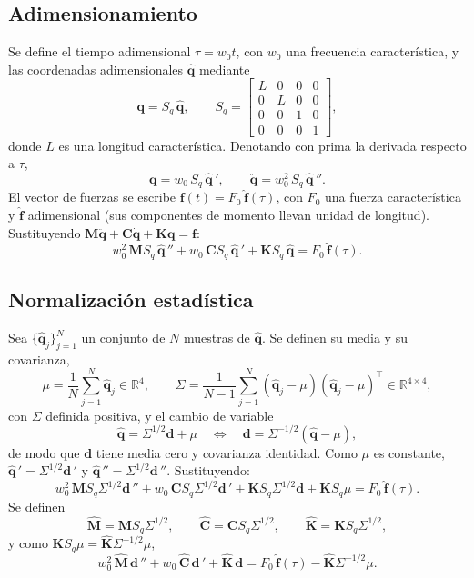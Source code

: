 \subsection{Adimensionamiento}

Se define el tiempo adimensional $\tau=w_0t$, con $w_0$ una frecuencia característica, y las coordenadas 
adimensionales $\hat{\mathbf q}$ mediante
\[
\mathbf q=S_q\,\hat{\mathbf q},\qquad
S_q=\begin{bmatrix}
L&0&0&0\\
0&L&0&0\\
0&0&1&0\\
0&0&0&1
\end{bmatrix},
\]
donde $L$ es una longitud característica. Denotando con prima la derivada respecto a $\tau$,
\[
\dot{\mathbf q}=w_0\,S_q\,\hat{\mathbf q}\,',\qquad
\ddot{\mathbf q}=w_0^2\,S_q\,\hat{\mathbf q}\,''.
\]
El vector de fuerzas se escribe $\mathbf f(t)=F_0\,\hat{\mathbf f}(\tau)$, con $F_0$ una fuerza característica y
 $\hat{\mathbf f}$ adimensional (sus componentes de momento llevan unidad de longitud). Sustituyendo 
  $\mathbf M\ddot{\mathbf q}+\mathbf C\dot{\mathbf q}+\mathbf K\mathbf q=\mathbf f$:
\[
w_0^2\,\mathbf MS_q\,\hat{\mathbf q}\,''+w_0\,\mathbf CS_q\,\hat{\mathbf q}\,'+\mathbf KS_q\,\hat{\mathbf q}=F_0\,\hat{\mathbf f}(\tau).
\]

\subsection{Normalización estadística}

Sea $\{\hat{\mathbf q}_j\}_{j=1}^N$ un conjunto de $N$ muestras de $\hat{\mathbf q}$. Se definen su media y su covarianza,
\[
\mu=\frac1N\sum_{j=1}^N\hat{\mathbf q}_j\in\mathbb R^4,\qquad
\Sigma=\frac1{N-1}\sum_{j=1}^N(\hat{\mathbf q}_j-\mu)(\hat{\mathbf q}_j-\mu)^\top\in\mathbb R^{4\times4},
\]
con $\Sigma$ definida positiva, y el cambio de variable
\[
\hat{\mathbf q}=\Sigma^{1/2}\mathbf d+\mu\quad\Longleftrightarrow\quad \mathbf d=\Sigma^{-1/2}(\hat{\mathbf q}-\mu),
\]
de modo que $\mathbf d$ tiene media cero y covarianza identidad. Como $\mu$ es constante, 
$\hat{\mathbf q}\,'=\Sigma^{1/2}\mathbf d\,'$ y $\hat{\mathbf q}\,''=\Sigma^{1/2}\mathbf d\,''$. Sustituyendo:
\[
w_0^2\,\mathbf MS_q\Sigma^{1/2}\mathbf d\,''+w_0\,\mathbf CS_q\Sigma^{1/2}\mathbf d\,'+\mathbf KS_q\Sigma^{1/2}\mathbf d+\mathbf KS_q\mu=F_0\,\hat{\mathbf f}(\tau).
\]
Se definen
\[
\hat{\mathbf M}=\mathbf MS_q\Sigma^{1/2},\qquad
\hat{\mathbf C}=\mathbf CS_q\Sigma^{1/2},\qquad
\hat{\mathbf K}=\mathbf KS_q\Sigma^{1/2},
\]
y como $\mathbf KS_q\mu=\hat{\mathbf K}\Sigma^{-1/2}\mu$,
\begin{equation}\label{eq:escalada}
w_0^2\,\hat{\mathbf M}\,\mathbf d\,''+w_0\,\hat{\mathbf C}\,\mathbf d\,'+\hat{\mathbf K}\,\mathbf d=F_0\,\hat{\mathbf f}(\tau)-\hat{\mathbf K}\Sigma^{-1/2}\mu .
\end{equation}

